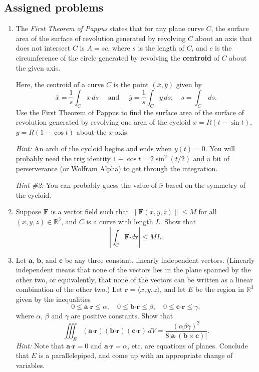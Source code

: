 \documentclass[letterpaper,12pt]{article}
\newcommand{\abs}[1]{\lvert #1\rvert}
\newcommand{\R}{\mathbb{R}}
\newcommand{\F}{\mathbf{F}}
\newcommand{\dotp}{\boldsymbol{\cdot}}
\newcommand{\aaa}{\mathbf{a}}
\newcommand{\bbb}{\mathbf{b}}
\newcommand{\ccc}{\mathbf{c}}
\renewcommand{\r}{\mathbf{r}}
\begin{document}
\subsection*{Assigned problems}
\begin{enumerate}
\item The \textit{First Theorem of Pappus} states that for any plane curve $C$, the surface area of the surface of revolution generated by revolving $C$ about an axis that does not intersect $C$ is $A = sc$, where $s$ is the length of $C$, and $c$ is the circumference of the circle generated by revolving the \textbf{centroid} of $C$ about the given axis.

Here, the centroid of a curve $C$ is the point $(\overline{x},\overline{y})$ given by
\[
 \overline{x} = \frac{1}{s}\int_C x\,ds \quad \text{ and } \quad \overline{y} = \frac{1}{s}\int_C y\,ds; \quad s = \int_C\,ds.
\]
Use the First Theorem of Pappus to find the surface area of the surface of revolution generated by revolving one arch of the cycloid $x=R(t-\sin t)$, $y=R(1-\cos t)$ about the $x$-axis.

\textit{Hint:} An arch of the cycloid begins and ends when $y(t)=0$. You will probably need the trig identity $1-\cos t = 2\sin^2(t/2)$ and a bit of perserverance (or Wolfram Alpha) to get through the integration. 

\textit{Hint \#2:} You can probably guess the value of $\overline{x}$ based on the symmetry of the cycloid.


\item Suppose $\F$ is a vector field such that $\lVert \F(x,y,z)\rVert\leq M$ for all $(x,y,z)\in\R^3$, and $C$ is a curve with length $L$. Show that
\[
 \left\lvert \int_C \F\dotp d\mathbf{r}\right\rvert \leq ML.
\]


\item  Let $\aaa$, $\bbb$, and $\ccc$ be any three constant, linearly independent vectors. (Linearly independent means that none of the vectors lies in the plane spanned by the other two, or equivalently, that none of the vectors can be written as a linear combination of the other two.) Let $\r = \langle x,y,z\rangle$, and let $E$ be the region in $\R^3$ given by the inequalities
\[
0\leq \aaa\dotp\r\leq \alpha,\quad 0\leq \bbb\dotp\r\leq \beta,\quad 0\leq \ccc\dotp\r\leq \gamma,
\]
where $\alpha,\, \beta$ and $\gamma$ are positive constants. Show that
\[
\iiint_E (\aaa\dotp\r)(\bbb\dotp\r)(\ccc\dotp\r)\,dV = \frac{(\alpha\beta\gamma)^2}{8\abs{\aaa\dotp(\bbb\times\ccc)}}.
\]
{\em Hint:} Note that $\aaa\dotp\r=0$ and $\aaa\dotp\r=\alpha$, etc. are equations of planes. Conclude that $E$ is a parallelepiped, and come up with an appropriate change of variables.

\end{enumerate}
\end{document}
